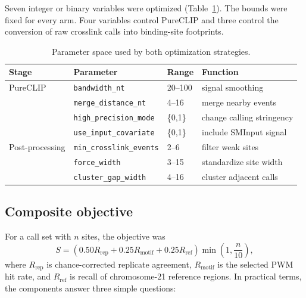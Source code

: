 Seven integer or binary variables were optimized (Table~\ref{tab:params}). The
bounds were fixed for every arm. Four variables control PureCLIP and three
control the conversion of raw crosslink calls into binding-site footprints.

\begin{table}[H]
\centering
\footnotesize
\begin{tabular}{@{}llll@{}}
\toprule
Stage & Parameter & Range & Function \\
\midrule
PureCLIP & \texttt{bandwidth\_nt}          & 20--100 & signal smoothing \\
         & \texttt{merge\_distance\_nt}    & 4--16   & merge nearby events \\
         & \texttt{high\_precision\_mode} & \{0,1\} & change calling stringency \\
         & \texttt{use\_input\_covariate} & \{0,1\} & include SMInput signal \\
Post-processing & \texttt{min\_crosslink\_events} & 2--6 & filter weak sites \\
                & \texttt{force\_width}          & 3--15 & standardize site width \\
                & \texttt{cluster\_gap\_width}   & 4--16 & cluster adjacent calls \\
\bottomrule
\end{tabular}
\caption{Parameter space used by both optimization strategies.}
\label{tab:params}
\end{table}

\subsection{Composite objective}

For a call set with $n$ sites, the objective was
\begin{equation}
S = \left(0.50R_\mathrm{rep}+0.25R_\mathrm{motif}+0.25R_\mathrm{ref}\right)
\min\!\left(1,\frac{n}{10}\right),
\label{eq:composite}
\end{equation}
where $R_\mathrm{rep}$ is chance-corrected replicate agreement,
$R_\mathrm{motif}$ is the selected PWM hit rate, and $R_\mathrm{ref}$ is recall
of chromosome-21 reference regions. In practical terms, the components answer
three simple questions:

